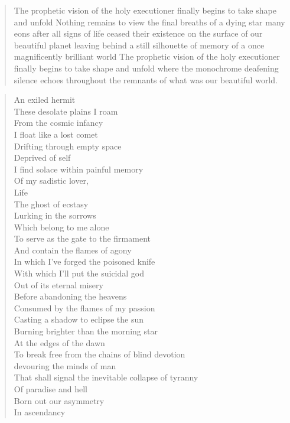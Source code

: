 \documentclass[../report.tex]{subfiles}
\begin{document}
\begin{quotation}
    The prophetic vision of the holy executioner finally begins to take shape and unfold
    Nothing remains to view the final breaths of a dying star many eons after all signs
    of life ceased their existence on the surface of our beautiful planet
    leaving behind a still silhouette of memory of a once magnificently brilliant world
    The prophetic vision of the holy executioner finally begins to take shape and unfold where the monochrome deafening silence echoes throughout the remnants of what was our beautiful world.
\end{quotation}

\begin{multicols}{2}
\begin{quotation}
	\noindent
	An exiled hermit\\
	These desolate plains I roam\\
	From the cosmic infancy\\
	I float like a lost comet\\
	Drifting through empty space\\
	Deprived of self\\
	I find solace within painful memory\\
	Of my sadistic lover,\\
	Life\\
	The ghost of ecstasy\\
	Lurking in the sorrows\\
	Which belong to me alone\\
	To serve as the gate to the firmament\\
	And contain the flames of agony\\
	In which I've forged the poisoned knife\\
	With which I'll put the suicidal god\\
	Out of its eternal misery\\
	Before abandoning the heavens\\
	Consumed by the flames of my passion\\
	Casting a shadow to eclipse the sun\\
	Burning brighter than the morning star\\
	At the edges of the dawn\\
	To break free from the chains of blind devotion\\
	devouring the minds of man\\
	That shall signal the inevitable collapse of tyranny\\
	Of paradise and hell\\
	Born out our asymmetry\\
	In ascendancy\\
\end{quotation}
\end{multicols}
\end{document}
